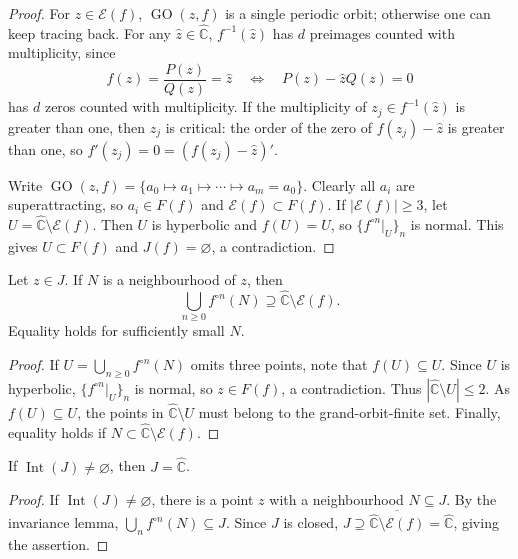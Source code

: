 \documentclass[11pt,a4paper]{article}
\begin{document}
\begin{proof}
For $z\in\mathcal E(f)$, $\operatorname{GO}(z,f)$ is a single periodic orbit; otherwise one can keep tracing back. For any $\widehat z\in\widehat{\mathbb C}$, $f^{-1}(\widehat z)$ has $d$ preimages counted with multiplicity, since
\[
f(z)=\frac{P(z)}{Q(z)}=\widehat z
\quad\Longleftrightarrow\quad P(z)-\widehat zQ(z)=0
\]
has $d$ zeros counted with multiplicity. If the multiplicity of $z_j\in f^{-1}(\widehat z)$ is greater than one, then $z_j$ is critical: the order of the zero of $f(z_j)-\widehat z$ is greater than one, so $f'(z_j)=0=(f(z_j)-\widehat z)'$.

Write $\operatorname{GO}(z,f)=\{a_0\mapsto a_1\mapsto\cdots\mapsto a_m=a_0\}$. Clearly all $a_i$ are superattracting, so $a_i\in F(f)$ and $\mathcal E(f)\subset F(f)$. If $|\mathcal E(f)|\ge3$, let $U=\widehat{\mathbb C}\setminus\mathcal E(f)$. Then $U$ is hyperbolic and $f(U)=U$, so $\{f^{\circ n}|_U\}_n$ is normal. This gives $U\subset F(f)$ and $J(f)=\varnothing$, a contradiction.
\end{proof}
\setcounter{theorem}{7}\begin{proposition}[Expansion]\label{cd1:expansion}
Let $z\in J$. If $N$ is a neighbourhood of $z$, then
\[
\bigcup_{n\ge0}f^{\circ n}(N)\supseteq\widehat{\mathbb C}\setminus\mathcal E(f).
\]
Equality holds for sufficiently small $N$.
\end{proposition}
\begin{proof}
If $U=\bigcup_{n\ge0}f^{\circ n}(N)$ omits three points, note that $f(U)\subseteq U$. Since $U$ is hyperbolic, $\{f^{\circ n}|_U\}_n$ is normal, so $z\in F(f)$, a contradiction. Thus $|\widehat{\mathbb C}\setminus U|\le2$. As $f(U)\subseteq U$, the points in $\widehat{\mathbb C}\setminus U$ must belong to the grand-orbit-finite set. Finally, equality holds if $N\subset\widehat{\mathbb C}\setminus\mathcal E(f)$.
\end{proof}
\setcounter{theorem}{8}\begin{proposition}\label{cd1:interior}
If $\operatorname{Int}(J)\ne\varnothing$, then $J=\widehat{\mathbb C}$.
\end{proposition}
\begin{proof}
If $\operatorname{Int}(J)\ne\varnothing$, there is a point $z$ with a neighbourhood $N\subseteq J$. By the invariance lemma, $\bigcup_n f^{\circ n}(N)\subseteq J$. Since $J$ is closed,
$J\supseteq\overline{\widehat{\mathbb C}\setminus\mathcal E(f)}=\widehat{\mathbb C}$, giving the assertion.
\end{proof}
\end{document}
